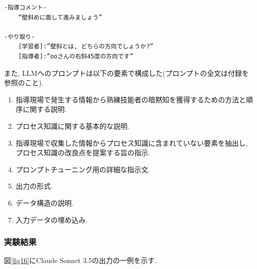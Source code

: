 \label{fig14}




\begin{tcolorbox}[breakable, colback=white, colframe=black]
    \begin{verbatim}
-指導コメント-
    “壁斜めに面して進みましょう”

-やり取り-
    [学習者]:”壁斜とは, どちらの方向でしょうか?”
    [指導者]:”ooさんの右斜45度の方向です”
    \end{verbatim}
\end{tcolorbox}
    
\label{fig15}



また, LLMへのプロンプトは以下の要素で構成した(プロンプトの全文は付録を参照のこと).
\begin{enumerate}
    \item 指導現場で発生する情報から熟練技能者の暗黙知を獲得するための方法と順序に関する説明.
    \item プロセス知識に関する基本的な説明.
    \item 指導現場で収集した情報からプロセス知識に含まれていない要素を抽出し, プロセス知識の改良点を提案する旨の指示.
    \item プロンプトチューニング用の詳細な指示文.
    \item 出力の形式.
    \item データ構造の説明.
    \item 入力データの埋め込み.	
\end{enumerate}




\subsubsection{実験結果}
図\ref{fig16}にClaude Sonnet 3.5の出力の一例を示す.

